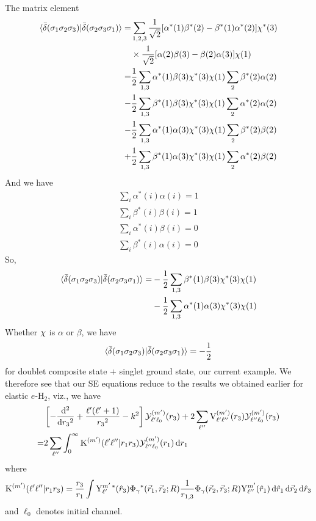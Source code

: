 \documentclass[aps,pra,groupedaddress,12pt,
               amsfonts,amssymb,
               preprint
    ]{revtex4}
\begin{document}
The matrix element
\begin{equation*}
\begin{split}
  \mathinner{\langle{\bar\delta(\sigma_1\sigma_2\sigma_3)|\bar\delta(\sigma_2\sigma_3\sigma_1)}\rangle}
  = & 
  \sum_{1,2,3}\dfrac{1}{\sqrt{2}}[\alpha^*(1)\beta^*(2)-\beta^*(1)\alpha^*(2)]\chi^*(3) \\
  & \times \dfrac{1}{\sqrt{2}}[\alpha(2)\beta(3)-\beta(2)\alpha(3)]\chi(1) \\
  = &
  \dfrac{1}{2}\sum_{1,3}\alpha^*(1)\beta(3)\chi^*(3)\chi(1)\sum_2\beta^*(2)\alpha(2) \\
  - &
  \dfrac{1}{2}\sum_{1,3}\beta^*(1)\beta(3)\chi^*(3)\chi(1)\sum_2\alpha^*(2)\alpha(2) \\
  - &
  \dfrac{1}{2}\sum_{1,3}\alpha^*(1)\alpha(3)\chi^*(3)\chi(1)\sum_2\beta^*(2)\beta(2) \\
  + &
  \dfrac{1}{2}\sum_{1,3}\beta^*(1)\alpha(3)\chi^*(3)\chi(1)\sum_2\alpha^*(2)\beta(2) \\
\end{split}
\end{equation*}
And we have
\begin{equation*}
\begin{split}
  \sum_i\alpha^*(i)\alpha(i) = 1 \\
  \sum_i\beta^*(i)\beta(i) = 1 \\
  \sum_i\alpha^*(i)\beta(i) = 0 \\
  \sum_i\beta^*(i)\alpha(i) = 0 
\end{split}
\end{equation*}
So,
\begin{equation*}
\begin{split}
  \mathinner{\langle{\bar\delta(\sigma_1\sigma_2\sigma_3)|\bar\delta(\sigma_2\sigma_3\sigma_1)}\rangle}
  = &
  - \dfrac{1}{2}\sum_{1,3}\beta^*(1)\beta(3)\chi^*(3)\chi(1) \\
  & - \dfrac{1}{2}\sum_{1,3}\alpha^*(1)\alpha(3)\chi^*(3)\chi(1)
\end{split}
\end{equation*}
Whether $\chi$ is $\alpha$ or $\beta$, we have
\begin{equation}
  \mathinner{\langle{\bar\delta(\sigma_1\sigma_2\sigma_3)|\bar\delta(\sigma_2\sigma_3\sigma_1)}\rangle}
 = -\dfrac{1}{2}
\end{equation}
for doublet composite state $+$ singlet ground state, our current
example. We therefore see that our SE equations reduce to the results we
obtained earlier for elastic $e$-H$_2$, viz., we have
\begin{equation}
  \label{eq:essch}
    \begin{split}
    &\left[-\dfrac{\mathrm{d}^2}{\mathrm{d} r_3{}^2}+\dfrac{\ell'(\ell'+1)}{r_3{}^2}-k^2\right]\mathcal{Y}_{\ell'\ell_0}^{(m')}(r_3) 
      + 2\sum_{\ell''}\mathrm{V}_{\ell'\ell''}^{(m')}(r_3)\mathcal{Y}_{\ell''\ell_0}^{(m')}(r_3) \\
   = &2\sum_{\ell''}\int_0^{\infty}\mathrm{K}^{(m')}(\ell'\ell''|r_1r_3)\mathcal{Y}_{\ell''\ell_0}^{(m')}(r_1)\,\mathrm{d} r_1
  \end{split}
\end{equation}
where
\begin{equation}
  \label{eq:kexhb}
  \mathrm{K}^{(m')}(\ell'\ell''|r_1r_3) = 
  \dfrac{r_3}{r_1}\int\mathrm{Y}_{\ell'}^{m'\,*}(\hat{r}_3)\Phi_\gamma{}^*(\vec{r}_{1},\vec{r}_{2};R)\dfrac{1}{r_{1,3}}\Phi_\gamma(\vec{r}_{2},\vec{r}_{3};R)
  \mathrm{Y}_{\ell''}^{m'}(\hat{r}_1)\,\mathrm{d}\hat{r}_1\,\mathrm{d}\vec{r}_2\,\mathrm{d}\hat{r}_3
\end{equation}
and $\ell_0$ denotes initial channel.
\end{document}
